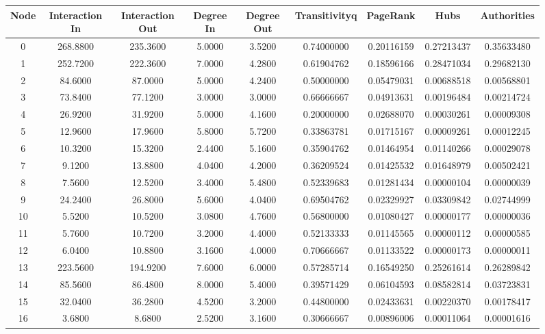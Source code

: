 \documentclass[12pt,a4paper]{thesis}
\begin{document}
\begin{figure}[H]
\centering
\tiny
\begin{tabular}{|c|c|c|c|c|c|c|c|c|}
\hline	Node	&	Interaction In	&	Interaction Out	&	Degree In	&	Degree Out	&	Transitivityq	&	PageRank	&	Hubs	&	Authorities	\\
\hline	0	&	268.8800	&	235.3600	&	5.0000	&	3.5200	&	0.74000000	&	0.20116159	&	0.27213437	&	0.35633480	\\
\hline	1	&	252.7200	&	222.3600	&	7.0000	&	4.2800	&	0.61904762	&	0.18596166	&	0.28471034	&	0.29682130	\\
\hline	2	&	84.6000	&	87.0000	&	5.0000	&	4.2400	&	0.50000000	&	0.05479031	&	0.00688518	&	0.00568801	\\
\hline	3	&	73.8400	&	77.1200	&	3.0000	&	3.0000	&	0.66666667	&	0.04913631	&	0.00196484	&	0.00214724	\\
\hline	4	&	26.9200	&	31.9200	&	5.0000	&	4.1600	&	0.20000000	&	0.02688070	&	0.00030261	&	0.00009308	\\
\hline	5	&	12.9600	&	17.9600	&	5.8000	&	5.7200	&	0.33863781	&	0.01715167	&	0.00009261	&	0.00012245	\\
\hline	6	&	10.3200	&	15.3200	&	2.4400	&	5.1600	&	0.35904762	&	0.01464954	&	0.01140266	&	0.00029078	\\
\hline	7	&	9.1200	&	13.8800	&	4.0400	&	4.2000	&	0.36209524	&	0.01425532	&	0.01648979	&	0.00502421	\\
\hline	8	&	7.5600	&	12.5200	&	3.4000	&	5.4800	&	0.52339683	&	0.01281434	&	0.00000104	&	0.00000039	\\
\hline	9	&	24.2400	&	26.8000	&	5.6000	&	4.0400	&	0.69504762	&	0.02329927	&	0.03309842	&	0.02744999	\\
\hline	10	&	5.5200	&	10.5200	&	3.0800	&	4.7600	&	0.56800000	&	0.01080427	&	0.00000177	&	0.00000036	\\
\hline	11	&	5.7600	&	10.7200	&	3.2000	&	4.4000	&	0.52133333	&	0.01145565	&	0.00000112	&	0.00000585	\\
\hline	12	&	6.0400	&	10.8800	&	3.1600	&	4.0000	&	0.70666667	&	0.01133522	&	0.00000173	&	0.00000011	\\
\hline	13	&	223.5600	&	194.9200	&	7.6000	&	6.0000	&	0.57285714	&	0.16549250	&	0.25261614	&	0.26289842	\\
\hline	14	&	85.5600	&	86.4800	&	8.0000	&	5.4000	&	0.39571429	&	0.06104593	&	0.08582814	&	0.03723831	\\
\hline	15	&	32.0400	&	36.2800	&	4.5200	&	3.2000	&	0.44800000	&	0.02433631	&	0.00220370	&	0.00178417	\\
\hline	16	&	3.6800	&	8.6800	&	2.5200	&	3.1600	&	0.30666667	&	0.00896006	&	0.00011064	&	0.00001616	\\

\end{tabular}
\end{figure}
\end{document}

